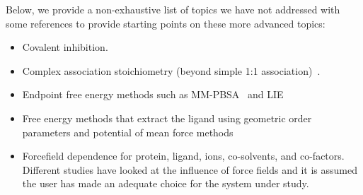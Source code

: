 \documentclass[9pt,bestpractices]{livecoms}
\begin{document}
Below, we provide a non-exhaustive list of topics we have not addressed with some references to provide starting points on these more advanced topics:
\begin{itemize}
\item Covalent inhibition.
\item Complex association stoichiometry (beyond simple 1:1 association)~\cite{awesome reference}. 
\item Endpoint free energy methods such as MM-PBSA~\cite{genheden2015mm} and LIE~\cite{gutierrez-de-teran2012linear}
\item Free energy methods that extract the ligand using geometric order parameters and potential of mean force methods~\cite{heinzelmann2017attachpullrelease}
\item Forcefield dependence for protein, ligand, ions, co-solvents, and co-factors. Different studies have looked at the influence of force fields and it is assumed the user has made an adequate choice for the system under study.~\cite{loeffler2018reproducibility, vassetti2019assessment, lopes2015current} 
\end{itemize}

\end{document}
